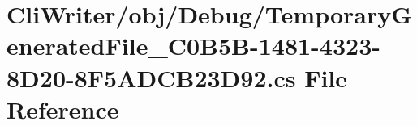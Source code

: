\hypertarget{_temporary_generated_file__036_c0_b5_b-1481-4323-8_d20-8_f5_a_d_c_b23_d92_8cs}{}\section{Cli\+Writer/obj/\+Debug/\+Temporary\+Generated\+File\+\_\+C0\+B5\+B-\/1481-\/4323-\/8\+D20-\/8\+F5\+A\+D\+C\+B23\+D92.cs File Reference}
\label{_temporary_generated_file__036_c0_b5_b-1481-4323-8_d20-8_f5_a_d_c_b23_d92_8cs}
